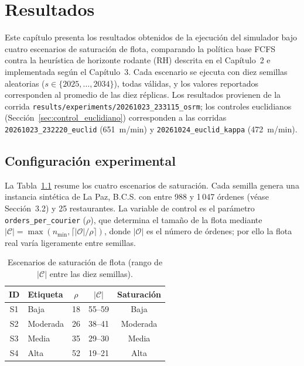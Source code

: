 \documentclass[12pt,letterpaper,oneside]{book}
\begin{document}
	\chapter{Resultados}

	Este capítulo presenta los resultados obtenidos de la ejecución del simulador bajo cuatro
	escenarios de saturación de flota, comparando la política base FCFS contra la heurística
	de horizonte rodante (RH) descrita en el Capítulo~2 e implementada según el Capítulo~3.
	Cada escenario se ejecuta con diez semillas aleatorias ($s \in \{2025, \ldots, 2034\}$),
	todas válidas, y los valores reportados corresponden al promedio de las diez réplicas.
	Los resultados provienen de la corrida \texttt{results/experiments/20261023\_233115\_osrm};
	los controles euclidianos (Sección~\ref{sec:control_euclidiano}) corresponden a las corridas
	\texttt{20261023\_232220\_euclid} (651~m/min) y \texttt{20261024\_euclid\_kappa}
	(472~m/min).

	\section{Configuración experimental}
	\label{sec:config_experimental}

	La Tabla~\ref{tab:escenarios} resume los cuatro escenarios de saturación.  Cada semilla
	genera una instancia sintética de La Paz, B.C.S. con entre 988 y 1\,047 órdenes
	(véase Sección~3.2) y 25 restaurantes.  La variable de control es el parámetro
	\texttt{orders\_per\_courier} ($\rho$), que determina el tamaño de la flota mediante
	$|\mathcal{C}| = \max(n_{\min}, \lceil |\mathcal{O}| / \rho \rceil)$, donde $|\mathcal{O}|$ es el número de órdenes; por ello
	la flota real varía ligeramente entre semillas.

	\begin{table}[htbp]
	\centering
	\caption{Escenarios de saturación de flota (rango de $|\mathcal{C}|$ entre las diez semillas).}
	\label{tab:escenarios}
	\begin{tabular}{@{}clccc@{}}
	\toprule
	ID & Etiqueta & $\rho$ & $|\mathcal{C}|$ & Saturación \\
	\midrule
	S1 & Baja     & 18 & 55--59 & Baja     \\
	S2 & Moderada & 26 & 38--41 & Moderada \\
	S3 & Media    & 35 & 29--30 & Media    \\
	S4 & Alta     & 52 & 19--21 & Alta     \\
	\bottomrule
	\end{tabular}
	\end{table}
\end{document}
